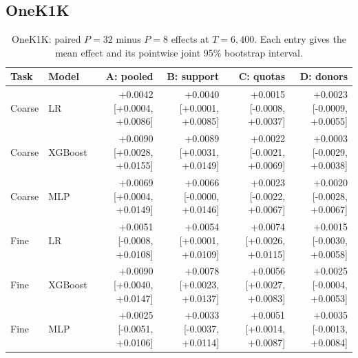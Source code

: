\subsection{OneK1K}
\begin{table}[htbp]\centering\small
\setlength{\tabcolsep}{3pt}\renewcommand{\arraystretch}{1.2}
\caption{OneK1K: paired $P=32$ minus $P=8$ effects at $T=6{,}400$. Each entry gives the mean effect and its pointwise joint 95\% bootstrap interval.}
\begin{tabular}{llrrrr}\toprule
Task & Model & A: pooled & B: support & C: quotas & D: donors \\\midrule
Coarse & LR & \makecell{+0.0042\\{[+0.0004, +0.0086]}} & \makecell{+0.0040\\{[+0.0001, +0.0085]}} & \makecell{+0.0015\\{[-0.0008, +0.0037]}} & \makecell{+0.0023\\{[-0.0009, +0.0055]}} \\
Coarse & XGBoost & \makecell{+0.0090\\{[+0.0028, +0.0155]}} & \makecell{+0.0089\\{[+0.0031, +0.0149]}} & \makecell{+0.0022\\{[-0.0021, +0.0069]}} & \makecell{+0.0003\\{[-0.0029, +0.0038]}} \\
Coarse & MLP & \makecell{+0.0069\\{[+0.0004, +0.0149]}} & \makecell{+0.0066\\{[-0.0000, +0.0146]}} & \makecell{+0.0023\\{[-0.0022, +0.0067]}} & \makecell{+0.0020\\{[-0.0028, +0.0067]}} \\
Fine & LR & \makecell{+0.0051\\{[-0.0008, +0.0108]}} & \makecell{+0.0054\\{[+0.0001, +0.0109]}} & \makecell{+0.0074\\{[+0.0026, +0.0115]}} & \makecell{+0.0015\\{[-0.0030, +0.0058]}} \\
Fine & XGBoost & \makecell{+0.0090\\{[+0.0040, +0.0147]}} & \makecell{+0.0078\\{[+0.0023, +0.0137]}} & \makecell{+0.0056\\{[+0.0027, +0.0083]}} & \makecell{+0.0025\\{[-0.0004, +0.0053]}} \\
Fine & MLP & \makecell{+0.0025\\{[-0.0051, +0.0106]}} & \makecell{+0.0033\\{[-0.0037, +0.0114]}} & \makecell{+0.0051\\{[+0.0014, +0.0087]}} & \makecell{+0.0035\\{[-0.0013, +0.0084]}} \\
\bottomrule\end{tabular}\end{table}
